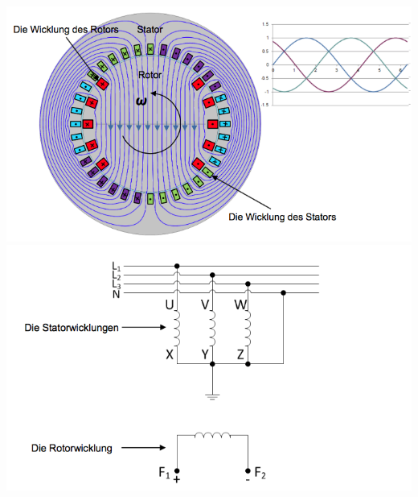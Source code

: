 \begin{minipage}{0.5 \linewidth}
\includegraphics[width = \linewidth]{./Pics/VL910/Aufbau2}
\includegraphics[width = \linewidth]{./Pics/VL910/Aufbau4}
\end{minipage}

